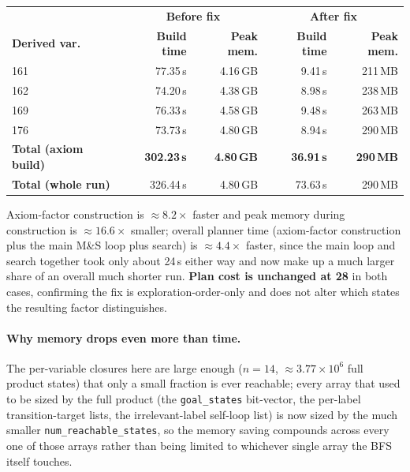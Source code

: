 \documentclass[11pt,a4paper]{article}
\begin{document}
\begin{center}
\begin{tabular}{lrrrr}
\toprule
& \multicolumn{2}{c}{\textbf{Before fix}} & \multicolumn{2}{c}{\textbf{After fix}} \\
\textbf{Derived var.} & \textbf{Build time} & \textbf{Peak mem.} & \textbf{Build time} & \textbf{Peak mem.} \\
\midrule
161 & 77.35\,s & 4.16\,GB & 9.41\,s & 211\,MB \\
162 & 74.20\,s & 4.38\,GB & 8.98\,s & 238\,MB \\
169 & 76.33\,s & 4.58\,GB & 9.48\,s & 263\,MB \\
176 & 73.73\,s & 4.80\,GB & 8.94\,s & 290\,MB \\
\midrule
\textbf{Total (axiom build)} & \textbf{302.23\,s} & \textbf{4.80\,GB} & \textbf{36.91\,s} & \textbf{290\,MB} \\
\textbf{Total (whole run)} & 326.44\,s & 4.80\,GB & 73.63\,s & 290\,MB \\
\bottomrule
\end{tabular}
\label{tab:step8-before-after}
\end{center}

Axiom-factor construction is $\approx 8.2\times$ faster and peak memory
during construction is $\approx 16.6\times$ smaller; overall planner time
(axiom-factor construction plus the main M\&S loop plus search) is
$\approx 4.4\times$ faster, since the main loop and search together took
only about 24\,s either way and now make up a much larger share of an
overall much shorter run. \textbf{Plan cost is unchanged at 28} in both
cases, confirming the fix is exploration-order-only and does not alter
which states the resulting factor distinguishes.

\paragraph{Why memory drops even more than time.} The per-variable closures
here are large enough ($n = 14$, $\approx 3.77 \times 10^6$ full product
states) that only a small fraction is ever reachable; every array that used
to be sized by the full product (the \texttt{goal\_states} bit-vector, the
per-label transition-target lists, the irrelevant-label self-loop list) is
now sized by the much smaller \texttt{num\_reachable\_states}, so the
memory saving compounds across every one of those arrays rather than being
limited to whichever single array the BFS itself touches.
\end{document}
